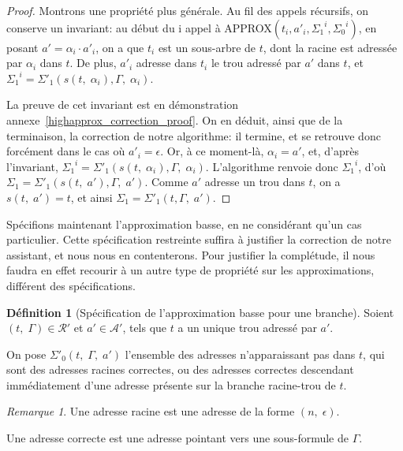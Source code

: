 \documentclass[11pt,a4paper]{article}
\theoremstyle{plain}
\theoremstyle{definition}
\newtheorem{definition}{Définition}
\theoremstyle{remark}
\newtheorem{remark}{Remarque}
\newcommand*{\sequent}{\Gamma}
\newcommand*{\treeaddresses}{\ensuremath{\mathcal{A'}}}
\newcommand*{\representationspartial}{\ensuremath{\mathcal{R'}}}
\newcommand*{\lowapprox}{\ensuremath{\Sigma_0}}
\newcommand*{\lowapproxspec}{\ensuremath{\Sigma'_0}}
\newcommand*{\highapprox}{\ensuremath{\Sigma_1}}
\newcommand*{\highapproxspec}{\ensuremath{\Sigma'_1}}
\newcommand*{\treesimplify}{\ensuremath{s}}
\begin{document}
\begin{proof}
    Montrons une propriété plus générale. Au fil des appels récursifs, on conserve un invariant: au début du i\ieme{} appel à APPROX$(t_i, a'_i, {\highapprox}^i, {\lowapprox}^i)$, en posant $a' = {\alpha}_i \cdot a'_i$, on a que $t_i$ est un sous-arbre de $t$, dont la racine est adressée par ${\alpha}_i$ dans $t$. De plus, $a'_i$ adresse dans $t_i$ le trou adressé par $a'$ dans $t$, et ${\highapprox}^i = \highapproxspec \left( \treesimplify( t, \; {\alpha}_i ), \sequent, \; {\alpha}_i \right)$.

    La preuve de cet invariant est en démonstration annexe~\ref{highapprox_correction_proof}. On en déduit, ainsi que de la terminaison, la correction de notre algorithme: il termine, et se retrouve donc forcément dans le cas où $a'_i = \epsilon$. Or, à ce moment-là, $\alpha_i = a'$, et, d'après l'invariant, ${\highapprox}^i = \highapproxspec \left( \treesimplify( t, \; {\alpha}_i ), \sequent, \; {\alpha}_i \right)$. L'algorithme renvoie donc ${\highapprox}^i$, d'où $\highapprox = \highapproxspec \left( \treesimplify( t, \; a' ), \sequent, \; a' \right)$. Comme $a'$ adresse un trou dans $t$, on a $\treesimplify( t, \; a' ) = t$, et ainsi $\highapprox = \highapproxspec \left( t, \sequent, \; a' \right)$.
\end{proof}

Spécifions maintenant l'approximation basse, en ne considérant qu'un cas particulier. Cette spécification restreinte suffira à justifier la correction de notre assistant, et nous nous en contenterons. Pour justifier la complétude, il nous faudra en effet recourir à un autre type de propriété sur les approximations, différent des spécifications.

\begin{definition}[Spécification de l'approximation basse pour une branche]
    \label{lowapprox_branch}
    Soient $(t, \; \sequent) \in \representationspartial$ et $a' \in \treeaddresses$, tels que $t$ a un unique trou adressé par $a'$.

    On pose $\lowapproxspec \left( t, \; \sequent, \; a' \right)$ l'ensemble des adresses n'apparaissant pas dans $t$, qui sont des adresses racines correctes, ou des adresses correctes descendant immédiatement d'une adresse présente sur la branche racine-trou de $t$.
\end{definition}

\begin{remark}
    Une adresse racine est une adresse de la forme $(n, \; \epsilon)$.
    
    Une adresse correcte est une adresse pointant vers une sous-formule de $\sequent$.
\end{remark}
\end{document}
